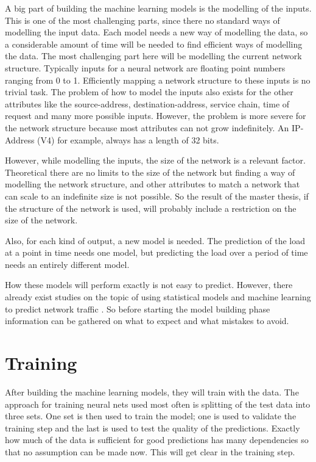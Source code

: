 \documentclass[12pt,a4paper]{scrartcl}
\begin{document}
	A big part of building the machine learning models is the modelling of the inputs.
	This is one of the most challenging parts, since there no standard ways of modelling the input data.
	Each model needs a new way of modelling the data, so a considerable amount of time will be needed to find efficient ways of modelling the data.
	The most challenging part here will be modelling the current network structure.
	Typically inputs for a neural network are floating point numbers ranging from 0 to 1.
	Efficiently mapping a network structure to these inputs is no trivial task.
	The problem of how to model the inputs also exists for the other attributes like the source-address, destination-address, service chain, time of request and many more possible inputs.
	However, the problem is more severe for the network structure because most attributes can not grow indefinitely. An IP-Address (V4) for example, always has a length of 32 bits.
	
	However, while modelling the inputs, the size of the network is a relevant factor.
	Theoretical there are no limits to the size of the network but finding a way of modelling the network structure, and other attributes to match a network that can scale to an indefinite size is not possible.
	So the result of the master thesis, if the structure of the network is used, will probably include a restriction on the size of the network.
	
	Also, for each kind of output, a new model is needed.
	The prediction of the load at a point in time needs one model, but predicting the load over a period of time needs an entirely different model.
	
	How these models will perform exactly is not easy to predict. However, there already exist studies on the topic of using statistical models and machine learning to predict network traffic \cite{networkStudies}.
	So before starting the model building phase information can be gathered on what to expect and what mistakes to avoid.
	
	\section{Training}
	After building the machine learning models, they will train with the data.
	The approach for training neural nets used most often is splitting of the test data into three sets.
	One set is then used to train the model; one is used to validate the training step and the last is used to test the quality of the predictions.
	Exactly how much of the data is sufficient for good predictions has many dependencies so that no assumption can be made now.
	This will get clear in the training step.
	
\end{document}
